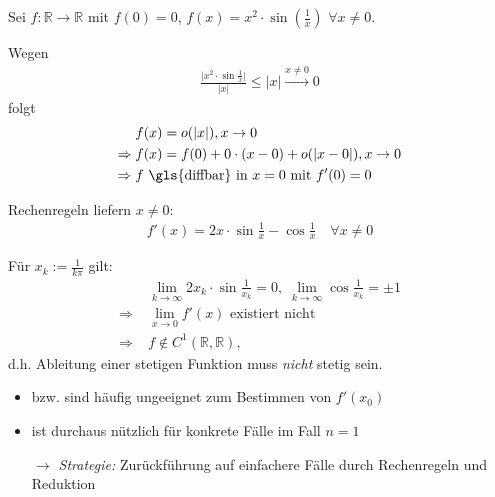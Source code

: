 \begin{example}
	Sei $f:\mathbb{R}\to \mathbb{R}$ mit $f(0) = 0$, $f(x)=x^2\cdot \sin\left(\frac{1}{x}\right)$ $\forall x\neq 0$.
	
	\begin{center}\end{center}
	
	Wegen \begin{align*}
		\frac{\vert x^2 \cdot \sin \frac{1}{x}\vert}{\vert x \vert} \le \vert x \vert \xrightarrow{x\neq 0} 0
	\end{align*}
	folgt{ \zeroAmsmathAlignVSpaces \begin{align*}
		& f(x) = o(\vert x \vert), x\to 0 \\
		\Rightarrow\;& f(x) = f(0) + 0\cdot (x - 0) + o(\vert x - 0\vert), x\to 0 \\
		\Rightarrow\;& f \text{  \gls{diffbar} in $x=0$ mit $f'(0) = 0$}
	\end{align*}}
	
	Rechenregeln liefern $x\neq 0$: \begin{align*}
		f'(x) = 2x\cdot\sin\frac{1}{x}- \cos\frac{1}{x} \quad\forall x\neq 0
	\end{align*}
	
	Für $x_k := \frac{1}{k\pi}$ gilt: \begin{align*}
		& \lim\limits_{k\to\infty} 2 x_k \cdot \sin \frac{1}{x_k} = 0,\; \lim\limits_{k\to\infty} \cos \frac{1}{x_k} = \pm 1 \\
		\Rightarrow\;& \lim\limits_{x\to 0} f'(x) \text{ existiert nicht} \\
		\Rightarrow\;& f\notin C^1(\mathbb{R}, \mathbb{R}),
	\end{align*}
	d.h. Ableitung einer stetigen Funktion muss \emph{nicht} stetig sein.
\end{example}

\begin{underlinedenvironment}
	\hspace{0pt}
\begin{itemize}[topsep=-2pt]
	\item {} bzw.  sind häufig ungeeignet zum Bestimmen von $f'(x_0)$
	\item {} ist durchaus nützlich für konkrete Fälle im Fall $n=1$
	
	\emph{$\rightarrow$ Strategie:} Zurückführung auf einfachere Fälle durch Rechenregeln und Reduktion
\end{itemize}
\end{underlinedenvironment}

